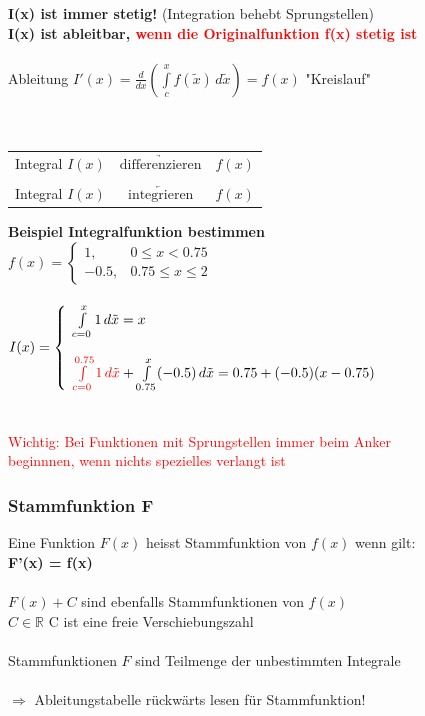 		\textbf{I(x) ist immer stetig!} (Integration behebt Sprungstellen) \\
		\textbf{I(x) ist ableitbar, \textcolor{red}{wenn die Originalfunktion f(x) stetig ist}}  \\
		\\
		Ableitung $I'(x) = \frac{d}{dx}\left( \int \limits_{c}^{x} f(\tilde{x}) \, d\tilde{x} \right) = f(x)$ \quad "Kreislauf" \\
		\\
		\\
		\begin{tabular}{l c l}
		Integral $I(x)$ &  $\underrightarrow{\text{differenzieren}}$ & $f(x)$ \\
		\\
		Integral $I(x)$ &  $\underleftarrow{\text{integrieren}}$ &  $f(x)$ 
		\end{tabular}
		
		
		\textbf{Beispiel Integralfunktion bestimmen}\\
		$f(x)=\left\{\begin{array}{ll} 1, & 0 \leq x < 0.75 \\
         -0.5, & 0.75 \leq x \leq 2 \end{array} \right.$	\\
     \\
     $I(x)=\left\{\begin{array}{l} \int \limits_{c=0}^{x} 1 \, d \tilde{x} = x \\
     \\
     \textcolor{red}{\int \limits_{c=0}^{0.75} 1 \, d \tilde{x}} + \int \limits_{0.75}^{x} (-0.5) \, d \tilde{x} = 0.75 + (-0.5)(x-0.75)\end{array} \right. $ \\
         	\\
         	\\
         	\textcolor{red}{Wichtig: Bei Funktionen mit Sprungstellen immer beim Anker \\
         	beginnnen, wenn nichts spezielles verlangt ist} \\
         	
		\subsubsection{Stammfunktion F}
		Eine Funktion $F(x)$ heisst Stammfunktion von $f(x)$ wenn gilt: \\
		\textbf{F'(x) = f(x)} \\
		\\
		$F(x) + C$ sind ebenfalls Stammfunktionen von $f(x)$ \\
		$C \in \mathbb{R}$ \quad C ist eine freie Verschiebungszahl\\
		\\
		Stammfunktionen $F$ sind Teilmenge der unbestimmten Integrale\\
		\\
		$\Rightarrow$ Ableitungstabelle rückwärts lesen für Stammfunktion!
		
